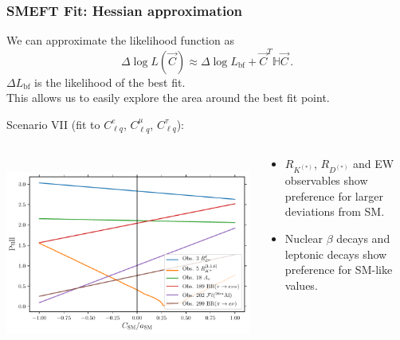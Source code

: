 \documentclass[mathserif, 10pt, dvipsnames]{beamer}
\begin{document}
\begin{frame}\frametitle{SMEFT Fit: Hessian approximation}

We can approximate the likelihood function as
$$\Delta\log L (\vec{C}) \approx \Delta\log L_\mathrm{bf} +
    \vec{C}^T \mathbb{H} \vec{C}\,.$$
{\footnotesize{$\Delta L_\mathrm{bf}$ is the likelihood of the best fit.}}\\[0.3em]
    This allows us to easily explore the area around the best fit point.

\vspace{0.3cm}
Scenario VII (fit to $C_{\ell q}^e$, $C_{\ell q}^\mu$, $C_{\ell
            q}^\tau$):
\begin{columns}
\begin{column}{0.52\textwidth}
\\
\includegraphics[width=\textwidth]{figures/evo_sm.pdf}
\end{column}
\begin{column}{0.40\textwidth}
    \begin{itemize}
        \item $R_{K^{(*)}}$, $R_{D^{(*)}}$ and EW observables show preference for larger deviations from SM.
        \item Nuclear $\beta$ decays and leptonic decays show preference for SM-like values.
    \end{itemize}
\end{column}
\end{columns}

\end{frame}
\end{document}
